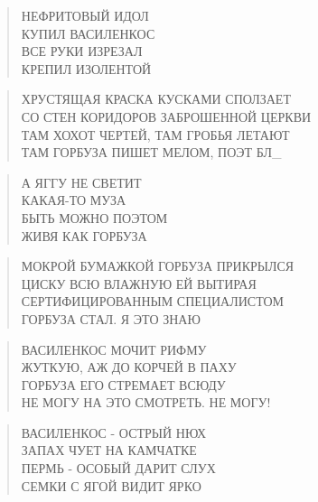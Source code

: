 \poemtitle{***}
\begin{verse}
НЕФРИТОВЫЙ ИДОЛ\\
КУПИЛ ВАСИЛЕНКОС\\
ВСЕ РУКИ ИЗРЕЗАЛ\\
КРЕПИЛ ИЗОЛЕНТОЙ
\end{verse}

\poemtitle{***}
\begin{verse}
ХРУСТЯЩАЯ КРАСКА КУСКАМИ СПОЛЗАЕТ\\
СО СТЕН КОРИДОРОВ ЗАБРОШЕННОЙ ЦЕРКВИ\\
ТАМ ХОХОТ ЧЕРТЕЙ, ТАМ ГРОБЬЯ ЛЕТАЮТ\\
ТАМ ГОРБУЗА ПИШЕТ МЕЛОМ, ПОЭТ БЛ\_
\end{verse}

\poemtitle{***}
\begin{verse}
А ЯГГУ НЕ СВЕТИТ\\
КАКАЯ-ТО МУЗА\\
БЫТЬ МОЖНО ПОЭТОМ\\
ЖИВЯ КАК ГОРБУЗА
\end{verse}

\poemtitle{***}
\begin{verse}
МОКРОЙ БУМАЖКОЙ ГОРБУЗА ПРИКРЫЛСЯ\\
ЦИСКУ ВСЮ ВЛАЖНУЮ ЕЙ ВЫТИРАЯ\\
СЕРТИФИЦИРОВАННЫМ СПЕЦИАЛИСТОМ\\
ГОРБУЗА СТАЛ. Я ЭТО ЗНАЮ
\end{verse}

\poemtitle{***}
\begin{verse}
ВАСИЛЕНКОС МОЧИТ РИФМУ\\
ЖУТКУЮ, АЖ ДО КОРЧЕЙ В ПАХУ\\
ГОРБУЗА ЕГО СТРЕМАЕТ ВСЮДУ\\
НЕ МОГУ НА ЭТО СМОТРЕТЬ. НЕ МОГУ!
\end{verse}

\poemtitle{***}
\begin{verse}
ВАСИЛЕНКОС - ОСТРЫЙ НЮХ\\
ЗАПАХ ЧУЕТ НА КАМЧАТКЕ\\
ПЕРМЬ - ОСОБЫЙ ДАРИТ СЛУХ\\
СЕМКИ С ЯГОЙ ВИДИТ ЯРКО
\end{verse}

